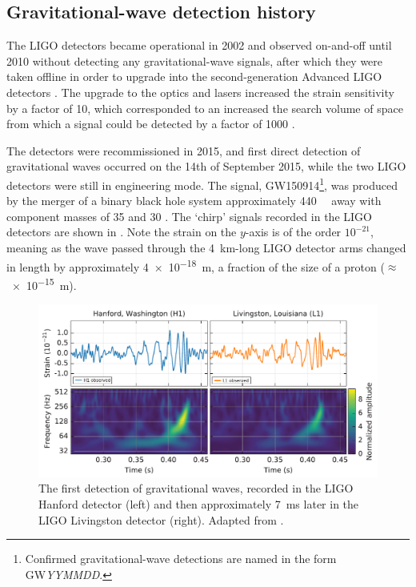 \subsection{Gravitational-wave detection history}
\label{sec:gw_detections}
\begin{colsection}

The LIGO detectors became operational in 2002 and observed on-and-off until 2010 without detecting any gravitational-wave signals, after which they were taken offline in order to upgrade into the second-generation Advanced LIGO detectors \citep{LIGO_initial, LIGO_advanced}. The upgrade to the optics and lasers increased the strain sensitivity by a factor of 10, which corresponded to an increased the search volume of space from which a signal could be detected by a factor of 1000 \citep{LIGO_advanced2}.

The detectors were recommissioned in 2015, and first direct detection of gravitational waves occurred on the 14th of September 2015, while the two LIGO detectors were still in engineering mode. The signal, GW150914\footnote{Confirmed gravitational-wave detections are named in the form GW\textit{YYMMDD}.}, was produced by the merger of a binary black hole system approximately \SI{440}{\mega\parsec} away with component masses of \SI{35}{\solarmass} and \SI{30}{\solarmass} \citep{GW150914}. The `chirp' signals recorded in the LIGO detectors are shown in . Note the strain on the $y$-axis is of the order $10^{-21}$, meaning as the wave passed through the \SI{4}{\kilo\metre}-long LIGO detector arms changed in length by approximately \SI{4e-18}{\metre}, a fraction of the size of a proton ($\approx$ \SI{e-15}{\metre}).

\begin{figure}[t]
    \begin{center}
        \includegraphics[width=\linewidth]{images/chirp2.pdf}
    \end{center}
    \caption[The first detection of gravitational waves]{
        The first detection of gravitational waves, recorded in the LIGO Hanford detector (left) and then approximately \SI{7}{\milli\second} later in the LIGO Livingston detector (right). Adapted from \citet{GW150914}.
        }\label{fig:chirp}
\end{figure}


\end{colsection}
